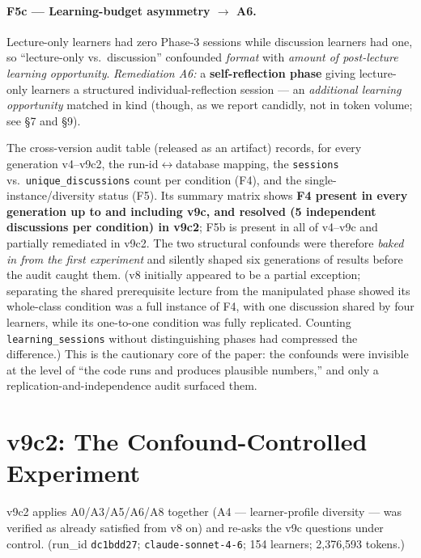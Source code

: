 \documentclass[11pt]{article}
\begin{document}
\paragraph{F5c --- Learning-budget asymmetry $\to$ A6.}
Lecture-only learners had zero Phase-3 sessions while discussion learners had one, so
``lecture-only vs.\ discussion'' confounded \emph{format} with \emph{amount of
post-lecture learning opportunity}.  \emph{Remediation A6:} a \textbf{self-reflection
phase} giving lecture-only learners a structured individual-reflection session --- an
\emph{additional learning opportunity} matched in kind (though, as we report
candidly, not in token volume; see \S7 and \S9).

The cross-version audit table (released as an artifact) records, for every generation
v4--v9c2, the run-id$\leftrightarrow$database mapping, the \texttt{sessions} vs.\
\texttt{unique\_discussions} count per condition (F4), and the single-instance/diversity
status (F5).  Its summary matrix shows \textbf{F4 present in every generation up to
and including v9c, and resolved (5 independent discussions per condition) in v9c2};
F5b is present in all of v4--v9c and partially remediated in v9c2.  The two structural
confounds were therefore \emph{baked in from the first experiment} and silently shaped
six generations of results before the audit caught them.  (v8 initially appeared to be
a partial exception; separating the shared prerequisite lecture from the manipulated
phase showed its whole-class condition was a full instance of F4, with one discussion
shared by four learners, while its one-to-one condition was fully replicated.
Counting \texttt{learning\_sessions} without distinguishing phases had compressed the
difference.)  This is the cautionary core of the paper: the
confounds were invisible at the level of ``the code runs and produces plausible
numbers,'' and only a replication-and-independence audit surfaced them.

\section{v9c2: The Confound-Controlled Experiment}

v9c2 applies A0/A3/A5/A6/A8 together (A4 --- learner-profile diversity --- was
verified as already satisfied from v8 on) and re-asks the v9c questions under control.
(run\_id \texttt{dc1bdd27}; \texttt{claude-sonnet-4-6}; 154 learners; 2,376,593
tokens.)
\end{document}
